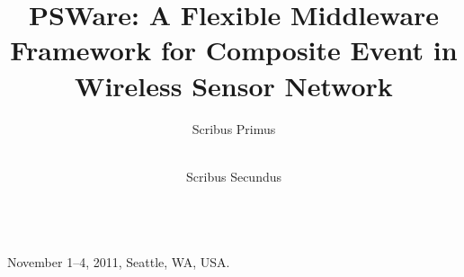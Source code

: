 \title{PSWare: A Flexible Middleware Framework for Composite Event in Wireless Sensor Network}
\author{
{Scribus Primus}\\
\\
 \and
{Scribus Secundus}\\
\\
}
 {November 1--4, 2011, Seattle, WA, USA.}
\maketitle